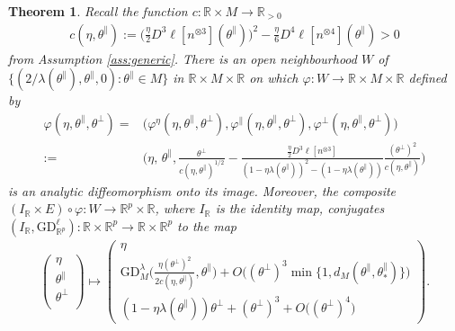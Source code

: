 \documentclass{article}
\newcommand{\RB}{\mathbb{R}}
\newcommand{\tpa}{\theta^{\parallel}}
\newcommand{\tpe}{\theta^{\perp}}
\newcommand{\GD}{\mathrm{GD}}
\theoremstyle{plain}
\newtheorem{theorem}{Theorem}[section]
\theoremstyle{definition}
\theoremstyle{remark}
\begin{document}
\begin{theorem}\label{thm:normalform}
    Recall the function $c:\RB\times M\rightarrow\RB_{>0}$
    \begin{align}
        c(\eta,\tpa):=\bigg(\frac{\eta}{2}D^3\ell[n^{\otimes 3}](\tpa)\bigg)^2-\frac{\eta}{6}D^4\ell[n^{\otimes 4}](\tpa)>0
    \end{align}
    from Assumption \ref{ass:generic}. There is an open neighbourhood $W$ of $\{(2/\lambda(\tpa),\tpa,0):\tpa\in M\}$ in $\RB\times M\times\RB$ on which $\varphi:W\rightarrow \RB\times M\times\RB$ defined by
    \begin{align}
        \varphi(\eta,\tpa,\tpe)=&\big(\varphi^{\eta}(\eta,\tpa,\tpe),\varphi^{\parallel}(\eta,\tpa,\tpe),\varphi^{\perp}(\eta,\tpa,\tpe)\big)\\:=&\bigg(\eta,\,\tpa, \frac{\tpe}{c(\eta,\tpa)^{1/2}} - \frac{\frac{\eta}{2}D^3\ell[n^{\otimes 3}]}{(1-\eta\lambda(\tpa))^2-(1-\eta\lambda(\tpa))}\frac{(\tpe)^2}{c(\eta,\tpa)}\bigg)\label{eq:varphi}
    \end{align}
    is an analytic diffeomorphism onto its image. Moreover, the composite $(I_{\RB}\times E)\circ \varphi:W\rightarrow\RB^p\times\RB$, where $I_{\RB}$ is the identity map,  conjugates $(I_{\RB},\GD^{\ell}_{\RB^p}):\RB\times \RB^p\rightarrow\RB\times\RB^p$ to the map
    \begin{align}
        \begin{pmatrix}
            \eta \\ \tpa\\\tpe\\
        \end{pmatrix}\mapsto \begin{pmatrix} \eta\\ \GD_M^{\lambda}\bigg(\frac{\eta(\tpe)^2}{2c(\eta,\tpa)},\tpa\bigg) + O\big((\tpe)^3\min\{1,d_M(\tpa,\tpa_*)\}\big)\\ (1-\eta\lambda(\tpa))\tpe + (\tpe)^3 + O\big((\tpe)^4\big)\end{pmatrix}.\label{eq:normalformula}
    \end{align}
\end{theorem}
\end{document}
